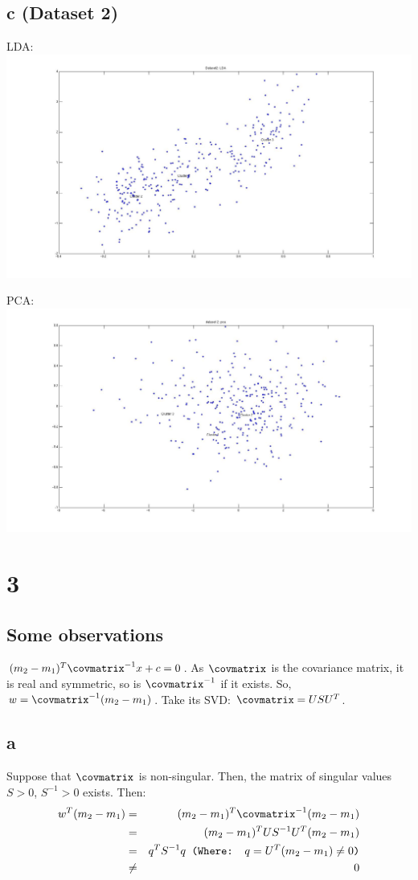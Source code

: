 \documentclass{article}
\begin{document}
\subsection{c  (Dataset 2)}
LDA:\\
\includegraphics[scale=.2]{images/dataset2lda.jpg}

PCA:\\
\includegraphics[scale=.2]{images/dataset2pca.jpg}


\section{3}
\subsection{Some observations}
$(m_{2} - m_{1})^{T}\covmatrix^{-1}x + c = 0$. As $\covmatrix$ is the covariance matrix, it is real and symmetric, so is $\covmatrix^{-1}$ if it exists. So, $w = \covmatrix^{-1}(m_{2} - m_{1})$. Take its SVD: $\covmatrix = US U^{T}$.

\subsection{a}
Suppose that $\covmatrix$ is non-singular. Then, the matrix of singular values $S > 0$, $S^{-1}>0$ exists. Then:
\begin{eqnarray}
w^{T}(m_{2} - m_{1}) &=& (m_{2} - m_{1})^{T}\covmatrix^{-1}(m_{2} - m_{1})\\
 &=& (m_{2} - m_{1})^{T}US^{-1} U^{T}(m_{2} - m_{1}) \\
 &=& q^{T}S^{-1}q \texttt{ (Where: $q = U^{T}(m_{2} - m_{1}) \neq 0$)} \\
 &\neq& 0\\
\end{eqnarray}
\end{document}
